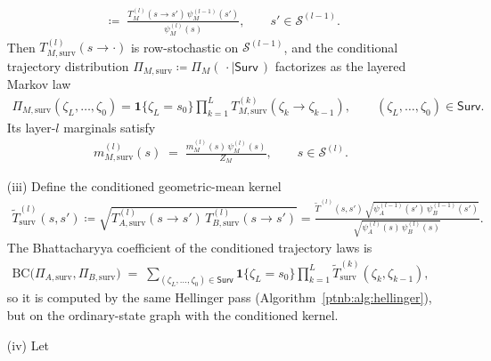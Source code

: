 \begin{theoremenv}
\begin{enumerate}
\begin{align}
            \;\coloneqq\;
            \frac{T_M^{(l)}(s \to s')\, \psi_M^{(l-1)}(s')}{\psi_M^{(l)}(s)},
            \qquad s' \in \mathcal{S}^{(l-1)}.
        \end{align}
        Then $T_{M,\mathrm{surv}}^{(l)}(s \to \cdot)$ is row-stochastic on $\mathcal{S}^{(l-1)}$, and the
        conditional trajectory distribution $\Pi_{M,\mathrm{surv}} \coloneqq \Pi_M(\,\cdot \mid
            \mathsf{Surv}\,)$ factorizes as the layered Markov law
        \begin{align}\label{ptnb:eq:conditioned-path-measure}
            \Pi_{M,\mathrm{surv}}(\zeta_L,\ldots,\zeta_0)
            = \mathbf{1}\{\zeta_L = s_0\} \prod_{k=1}^{L} T_{M,\mathrm{surv}}^{(k)}(\zeta_k \to \zeta_{k-1}),
            \qquad (\zeta_L,\ldots,\zeta_0) \in \mathsf{Surv}.
        \end{align}
        Its layer-$l$ marginals satisfy
        \begin{align}\label{ptnb:eq:conditioned-alpha}
            m_{M,\mathrm{surv}}^{(l)}(s)
            \;=\;
            \frac{m_M^{(l)}(s)\, \psi_M^{(l)}(s)}{Z_M},
            \qquad s \in \mathcal{S}^{(l)}.
        \end{align}
    \item[(iii)] Define the conditioned geometric-mean kernel
        \begin{align}\label{ptnb:eq:conditioned-geom-kernel}
            \widetilde{T}_{\mathrm{surv}}^{(l)}(s,s')
            \coloneqq \sqrt{T_{A,\mathrm{surv}}^{(l)}(s \to s')\, T_{B,\mathrm{surv}}^{(l)}(s \to s')}
            = \frac{\widetilde{T}^{(l)}(s,s')\, \sqrt{\psi_A^{(l-1)}(s')\,
            \psi_B^{(l-1)}(s')}}{\sqrt{\psi_A^{(l)}(s)\, \psi_B^{(l)}(s)}}.
        \end{align}
        The Bhattacharyya coefficient of the conditioned trajectory laws is
        \begin{align}\label{ptnb:eq:conditioned-bc-kernel}
            \mathrm{BC}\!\bigl(\Pi_{A,\mathrm{surv}}, \Pi_{B,\mathrm{surv}}\bigr)
            \;=\;
            \sum_{(\zeta_L,\ldots,\zeta_0) \in \mathsf{Surv}}
            \mathbf{1}\{\zeta_L = s_0\}
            \prod_{k=1}^{L} \widetilde{T}_{\mathrm{surv}}^{(k)}(\zeta_k, \zeta_{k-1}),
        \end{align}
        so it is computed by the same Hellinger pass (Algorithm~\ref{ptnb:alg:hellinger}), but on the
        ordinary-state graph with the conditioned kernel.
    \item[(iv)] Let
        \begin{align}\label{ptnb:eq:ordinary-bc}

\end{align}
\end{enumerate}
\end{theoremenv}
